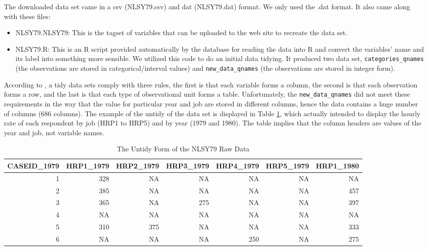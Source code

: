 The downloaded data set came in a csv (NLSY79.csv) and dat (NLSY79.dat)
format. We only used the .dat format. It also came along with these
files:

\begin{itemize}
\tightlist
\item
  NLSY79.NLSY79: This is the tagset of variables that can be uploaded to
  the web site to recreate the data set.
\item
  NLSY79.R: This is an R script provided automatically by the database
  for reading the data into R and convert the variables' name and its
  label into something more sensible. We utilized this code to do an
  initial data tidying. It produced two data set,
  \texttt{categories\_qnames} (the observations are stored in
  categorical/interval values) and \texttt{new\_data\_qnames} (the
  observations are stored in integer form).
\end{itemize}

According to \citet{WickhamHadley2014TD}, a tidy data sets comply with
three rules, the first is that each variable forms a column, the second
is that each observation forms a row, and the last is that each type of
observational unit forms a table. Unfortunately, the
\texttt{new\_data\_qnames} did not meet these requirements in the way
that the value for particular year and job are stored in different
columns, hence the data contains a huge number of columns (686 columns).
The example of the untidy of the data set is displayed in Table
\ref{tab:untidy-data}, which actually intended to display the hourly
rate of each respondent by job (HRP1 to HRP5) and by year (1979 and
1980). The table implies that the column headers are values of the year
and job, not variable names.

\begin{Schunk}
\begin{table}

\caption{\label{tab:untidy-data}The Untidy Form of the NLSY79 Raw Data}
\centering
\begin{tabular}[t]{r|r|r|r|r|r|r}
\hline
CASEID\_1979 & HRP1\_1979 & HRP2\_1979 & HRP3\_1979 & HRP4\_1979 & HRP5\_1979 & HRP1\_1980\\
\hline
\rowcolor{gray!6}  1 & 328 & NA & NA & NA & NA & NA\\
\hline
2 & 385 & NA & NA & NA & NA & 457\\
\hline
\rowcolor{gray!6}  3 & 365 & NA & 275 & NA & NA & 397\\
\hline
4 & NA & NA & NA & NA & NA & NA\\
\hline
\rowcolor{gray!6}  5 & 310 & 375 & NA & NA & NA & 333\\
\hline
6 & NA & NA & NA & 250 & NA & 275\\
\hline
\end{tabular}
\end{table}

\end{Schunk}


